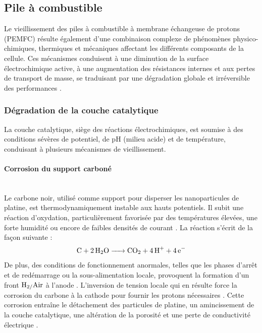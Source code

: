 \subsection{Pile à combustible}

Le vieillissement des piles à combustible à membrane échangeuse de protons (PEMFC) résulte également d'une combinaison complexe de phénomènes physico-chimiques, thermiques et mécaniques affectant les différents composants de la cellule. Ces mécanismes conduisent à une diminution de la surface électrochimique active, à une augmentation des résistances internes et aux pertes de transport de masse, se traduisant par une dégradation globale et irréversible des performances \cite{yousfi-steiner_review_2009}\cite{pahon_review_2022}. 

\subsubsection{Dégradation de la couche catalytique}

La couche catalytique, siège des réactions électrochimiques, est soumise à des conditions sévères de potentiel, de pH (milieu acide) et de température, conduisant à plusieurs mécanismes de vieillissement.

\paragraph{Corrosion du support carboné}\mbox{}\\
Le carbone noir, utilisé comme support pour disperser les nanoparticules de platine, est thermodynamiquement instable aux hauts potentiels. Il subit une réaction d'oxydation, particulièrement favorisée par des températures élevées, une forte humidité ou encore de faibles densités de courant \cite{maass_carbon_2008}\cite{zhao_carbon_2021}. La réaction s'écrit de la façon suivante :
$$\ce{C + 2H2O -> CO2 + 4H^+ + 4e^-}$$
De plus, des conditions de fonctionnement anormales, telles que les phases d'arrêt et de redémarrage ou la sous-alimentation locale, provoquent la formation d'un front $\ce{H2/Air}$ à l'anode \cite{ren_degradation_2020}. L'inversion de tension locale qui en résulte force la corrosion du carbone à la cathode pour fournir les protons nécessaires \cite{gerard_oxygen_2010}. Cette corrosion entraîne le détachement des particules de platine, un amincissement de la couche catalytique, une altération de la porosité et une perte de conductivité électrique \cite{wang_pem_2011}.

